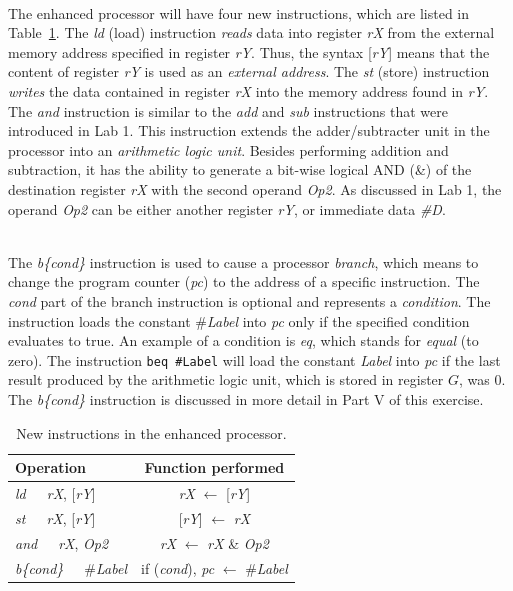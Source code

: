 \documentclass[epsfig,10pt,fullpage]{article}
\begin{document}
~\\
\noindent
The enhanced processor will have four new instructions, which are listed
in Table~\ref{tab:new_instr}.  The {\it ld} (load) instruction {\it reads} data into 
register {\it rX} from the external memory address specified in register {\it rY}. Thus, 
the syntax [{\it rY}] means that the content of register {\it rY} is used as an
{\it external address}. The {\it st} (store) instruction {\it writes} the data contained 
in register {\it rX} into the memory address found in {\it rY}. The {\it and} instruction 
is similar to the {\it add} and {\it sub} instructions that were introduced in Lab 1.
This instruction extends the adder/subtracter unit in the processor into an
{\it arithmetic logic unit}. Besides performing addition and subtraction, it 
has the ability to generate a bit-wise logical AND (\&) of the destination register
{\it rX} with the second operand {\it Op2}. As discussed
in Lab 1, the operand {\it Op2} can be either another register {\it rY}, or immediate
data {\it \#D}.

~\\
\noindent
The {\it b\{cond\}} instruction is used to cause a processor {\it branch}, which means to
change the program counter ({\it pc}) to the address of a specific instruction. The {\it cond}
part of the branch instruction is optional and represents a {\it condition}. The instruction 
loads the constant \#{\it Label} into {\it pc} only if the specified condition evaluates to true.
An example of a condition is {\it eq}, which stands for {\it equal} (to zero). 
The instruction \texttt{beq \#Label} will load the constant {\it Label} into {\it pc} if the
last result produced by the arithmetic logic unit, which is stored in register $G$, was 0. 
The {\it b\{cond\}} instruction is discussed in more detail in Part V of this exercise.

\begin{table}[H]
\begin{center}
\begin{tabular}{l|c}
\rule[-0.075in]{0in}{0.25in}Operation & Function performed \\ \hline 
\rule[-0.075in]{0in}{0.25in}{\it ld}~~~{\it rX}, [{\it rY}] & {\it rX} $\leftarrow$ [{\it rY}] \\ 
\rule[-0.075in]{0in}{0.25in}{\it st}~~~{\it rX}, [{\it rY}] & [{\it rY}] $\leftarrow$ {\it rX} \\ 
\rule[-0.075in]{0in}{0.25in}{\it and}~~~{\it rX}, {\it Op2} & {\it rX} $\leftarrow$ {\it rX} \& {\it Op2} \\ 
\rule[-0.075in]{0in}{0.25in}{\it b\{cond\}}~~~\#{\it Label} & if ({\it cond}), {\it pc} $\leftarrow$ \#{\it Label} \\ 
\end{tabular}
\caption{New instructions in the enhanced processor.}
\label{tab:new_instr}
\end{center}
\end{table}
\end{document}
